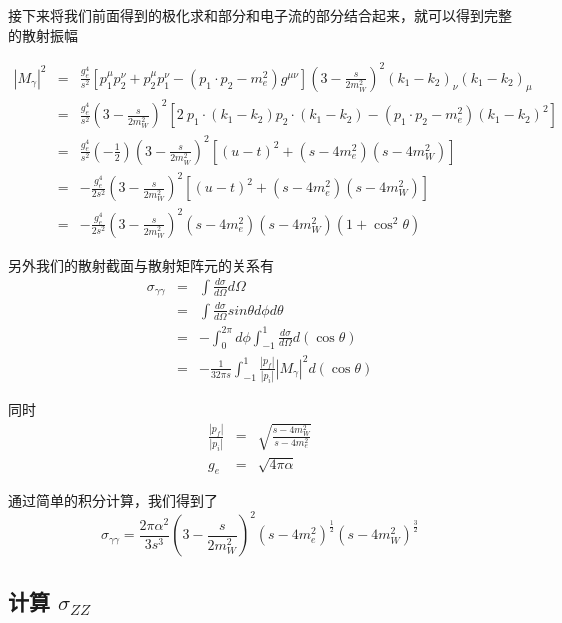 \documentclass{article}
\begin{document}
接下来将我们前面得到的极化求和部分和电子流的部分结合起来，就可以得到完整的散射振幅


\begin{eqnarray*}
    \left|M_\gamma\right|^2 &=& \frac{g_e^4}{s^2}\left[p_1^\mu p_2^\nu + p_2^\mu p_1^\nu - \left(p_1 \cdot p_2 - m_e^2\right)g^{\mu\nu}\right] \left(3 - \frac{s}{2m_W^2}\right)^2 (k_1 - k_2)_\nu (k_1 - k_2)_\mu \\
    &=& \frac{g_e^4}{s^2} \left(3 - \frac{s}{2m_W^2}\right)^2 \left[2 \ p_1 \cdot (k_1 - k_2) p_2 \cdot (k_1 - k_2) - \left(p_1 \cdot p_2 - m_e^2\right)\left(k_1 - k_2\right)^2\right] \\
    &=& \frac{g_e^4}{s^2} (-\frac{1}{2})\left(3 - \frac{s}{2m_W^2}\right)^2\left[(u - t)^2 + \left(s - 4m_e^2 \right)\left(s - 4m_W^2\right)\right] \\
    &=& -\frac{g_e^4}{2s^2}\left(3 - \frac{s}{2m_W^2}\right)^2\left[(u - t)^2 + \left(s - 4m_e^2 \right)\left(s - 4m_W^2\right)\right] \\
    &=& -\frac{g_e^4}{2s^2}\left(3 - \frac{s}{2m_W^2}\right)^2 \left(s - 4m_e^2 \right)\left(s - 4m_W^2\right) \left(1 + \cos^2{\theta}\right)
\end{eqnarray*}


另外我们的散射截面与散射矩阵元的关系有
\begin{eqnarray*}
    \sigma_{\gamma\gamma} &=& \int \frac{d\sigma}{d\Omega} d\Omega \\
    &=& \int \frac{d\sigma}{d\Omega} sin\theta d\phi d\theta \\
    &=& -\int_{0}^{2\pi} d\phi \int_{-1}^{1} \frac{d\sigma}{d\Omega} d(\cos{\theta}) \\
    &=& -\frac{1}{32 \pi s} \int_{-1}^{1} \frac{|p_f|}{|p_i|} \left|M_\gamma\right|^2 d(\cos{\theta})
\end{eqnarray*}

同时
\begin{eqnarray*}
    \frac{|p_f|}{|p_i|} &=& \sqrt{\frac{s - 4m_W^2}{s - 4m_e^2}} \\
    g_e &=& \sqrt{4\pi\alpha}
\end{eqnarray*}

通过简单的积分计算，我们得到了
\begin{equation}
    \sigma_{\gamma\gamma} = \frac{2 \pi \alpha^2}{3s^3}\left(3 - \frac{s}{2m_W^2}\right)^2 \left(s - 4m_e^2 \right)^{\frac{1}{2}}\left(s - 4m_W^2\right)^{\frac{3}{2}}
\end{equation}

\subsection{计算 $\sigma_{ZZ}$}
\end{document}
